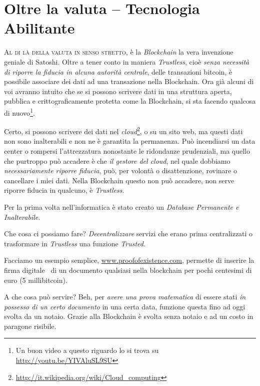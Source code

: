 \documentclass[a4paper,12pt,italian]{article}
\begin{document}
\section*{Oltre la valuta -- Tecnologia Abilitante}


\lettrine{A}{l di là della valuta in senso stretto}, è la \emph{Blockchain} la vera invenzione 
geniale di Satoshi.
Oltre a tener conto in maniera \emph{Trustless}, cioè \emph{senza
necessità di riporre la fiducia in alcuna autorità centrale}, delle
transazioni bitcoin, è possibile associare dei dati ad una
transazione nella Blockchain. Ora già alcuni di voi avranno intuito che
se si possono scrivere dati in una struttura aperta, pubblica e
crittograficamente protetta come la Blockchain, si sta facendo qualcosa
di nuovo\footnote{Un buon video a questo riguardo lo si trova su
\url{http://youtu.be/YIVAluSL9SU}}.


\bigskip

Certo, si possono scrivere dei dati nel \emph{cloud}\footnote{\url{http://it.wikipedia.org/wiki/Cloud_computing}}, o su un sito web, ma
questi dati non sono inalterabili e non ne è garantita la permanenza. Può incendiarsi un data center
o rompersi l'attrezzatura nonostante le ridondanze prudenziali, ma quello che purtroppo può accadere
è che \emph{il gestore del cloud}, nel quale dobbiamo \emph{necessariamente riporre fiducia}, può, per volontà o disattenzione, rovinare o cancellare i miei
dati. Nella Blockchain questo non può accadere, non serve riporre fiducia in qualcuno, è \emph{Trustless}.

\bigskip

Per la prima volta nell’informatica è stato creato un \emph{Database
Permanente e Inalterabile}.


\bigskip

Che cosa ci possiamo fare? \emph{Decentralizzare} servizi che erano prima
centralizzati o trasformare in \emph{Trustless} una funzione \emph{Trusted}.


\bigskip

Facciamo un esempio semplice, \url{www.proofofexistence.com}, permette di
inserire la firma digitale \ di un documento qualsiasi nella blockchain
per pochi centesimi di euro (5 millibitcoin).


A che cosa può servire? Beh, per \emph{avere una prova matematica} di essere
stati \emph{in possesso di un certo documento} in una certa data, funzione
questa fino ad oggi svolta da un notaio. Grazie alla Blockchain è
svolta senza notaio e ad un costo in paragone risibile.
\end{document}
